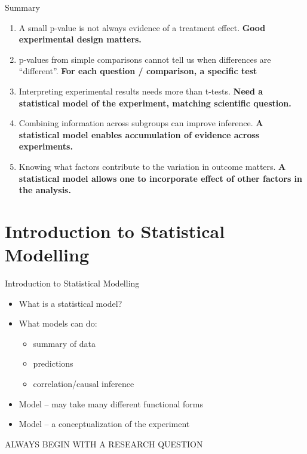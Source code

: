 \documentclass[10pt]{beamer}
\begin{document}
\begin{frame}{Summary}
 \begin{enumerate}[<+->]
  \item A small p-value is not always evidence of a treatment effect. \textbf{Good experimental design matters.}
  \item p-values from simple comparisons cannot tell us when differences are “different”. \textbf{For each question / comparison, a specific test}
  \item Interpreting experimental results needs more than t-tests. \textbf{Need a statistical model of the experiment, matching scientific question.}
  \item Combining information across subgroups can improve inference. \textbf{A statistical model enables accumulation of evidence across experiments.}
  \item Knowing what factors contribute to the variation in outcome matters. \textbf{A statistical model allows one to incorporate effect of other factors in the analysis.}
 \end{enumerate}

\end{frame}

\section{Introduction to Statistical Modelling}

\begin{frame}{Introduction to Statistical Modelling}
 \begin{itemize}
  \item What is a statistical model?
  \item What models can do:
    \begin{itemize}
      \item summary of data 
      \item predictions 
      \item correlation/causal inference
     \end{itemize}
  \item Model – may take many different functional forms
  \item Model – a conceptualization of the experiment 
 \end{itemize}
 \pause
ALWAYS BEGIN WITH A RESEARCH QUESTION
\end{frame}
\end{document}
